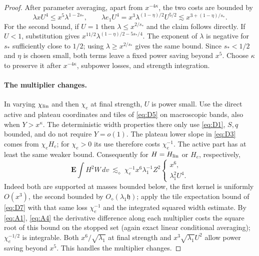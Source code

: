 \begin{proof}
After parameter averaging, apart from $x^{-4\kappa}$, the two costs
are bounded by
\[
 \lambda xU^4\le x^5\lambda^{1-2s_*},\qquad
 \lambda e_1U^4=x^3\lambda^{(1-\eta)/2}U^{5/2}
       \lesssim x^{3+(1-\eta)/s_*}.
\]
For the second bound, if $U=1$ then $\lambda\le x^{2/s_*}$ and the
claim follows directly.  If $U<1$, substitution gives
$x^{11/2}\lambda^{(1-\eta)/2-5s_*/4}$.
The exponent of $\lambda$ is negative for $s_*$ sufficiently close
to $1/2$; using $\lambda\ge x^{2/s_*}$ gives the same bound.
Since $s_*<1/2$ and $\eta$ is chosen small, both terms leave a fixed
power saving beyond $x^5$.  Choose $\kappa$ to preserve it after
$x^{-4\kappa}$, subpower losses, and strength integration.

\paragraph{The multiplier changes.}
In varying \(\chi_{\rm lin}\) and then \(\chi_e\) at final strength, \(U\) is power small. Use the direct active and plateau coordinates and tiles of \eqref{eq:D5} on macroscopic bands, also when \(Y>x^\kappa\). The deterministic width properties there only use \eqref{eq:D1}, \(S,q\) bounded, and do not require \(Y=o(1)\). The plateau lower slope in \eqref{eq:D3} comes from $\chi_eH_e$;
for $\chi_e>0$ its use therefore costs $\chi_e^{-1}$.  The active
part has at least the same weaker bound.  Consequently for \(H=H_{\rm lin}\) or \(H_e\), respectively,
\begin{equation*}
\mathbf E\int H^2 W\,dv\ \lesssim_\diamond\
   \chi_e^{-1}x^6\lambda_1^{-1} Z^2
       \begin{cases}
          x^6,\\ \lambda_1^2 U^4.
       \end{cases}
\end{equation*}
Indeed both are supported at masses bounded below, the first kernel is uniformly \(O(x^3)\), the second bounded by \(O_\diamond(\lambda_1\mathfrak h)\); apply the tile expectation bound of \eqref{eq:D7} with that same loss \(\chi_e^{-1}\) and the integrated squared width estimate. By \eqref{eq:A1}, \eqref{eq:A4} the derivative difference along each multiplier costs the square root of this bound on the stopped set (again exact linear conditional averaging); \(\chi_e^{-1/2}\) is integrable. Both \(x^6/\sqrt{\lambda_1}\) at final strength and \(x^3\sqrt{\lambda_1} U^2\) allow power saving beyond \(x^5\). This handles the multiplier changes.
\end{proof}


